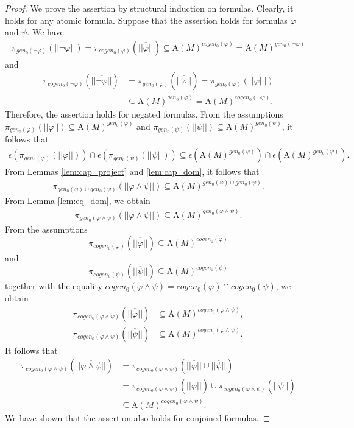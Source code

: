 \documentclass{lmcs}
\def\A{\textrm{A}}
\def\gen{gen}
\def\cogen{cogen}
\def\genz{\gen_0}
\def\cogenz{\cogen_0}
\begin{document}
\begin{proof}
We prove the assertion by structural induction on formulas. Clearly, it holds for any atomic formula. Suppose that the assertion holds for formulas $\varphi$ and $\psi$. We have
\begin{align*}
\pi_{\genz(\neg\varphi)}(||\neg\varphi||)=\pi_{\cogenz(\varphi)}(\overline{||\varphi||})\subseteq\A(M)^{\cogenz(\varphi)}=\A(M)^{\genz(\neg\varphi)}
\end{align*}
and 
\begin{align*}
\pi_{\cogenz(\neg\varphi)}(\overline{||\neg\varphi||})&=\pi_{\genz(\varphi)}(\overline{\overline{||\varphi||}})=\pi_{\genz(\varphi)}(||\varphi|||)\\
&\subseteq\A(M)^{\genz(\varphi)}=\A(M)^{\cogenz(\neg\varphi)}.
\end{align*}
Therefore, the assertion holds for negated formulas.
From the assumptions $\pi_{\genz(\varphi)}(||\varphi||)\subseteq \A(M)^{\genz(\varphi)}$ and $\pi_{\genz(\psi)}(||\psi||)\subseteq \A(M)^{\genz(\psi)}$, it follows that 
\begin{align*}
\epsilon(\pi_{\genz(\varphi)}(||\varphi||))\cap\epsilon(\pi_{\genz(\psi)}(||\psi||))\subseteq\epsilon(\A(M)^{\genz(\varphi)})\cap\epsilon(\A(M)^{\genz(\psi)}).
\end{align*}
From Lemmas \ref{lem:cap_project} and \ref{lem:cap_dom}, it follows that
\begin{align*}
\pi_{\genz(\varphi)\cup\genz(\psi)}(||\varphi\wedge\psi||)\subseteq\A(M)^{\genz(\varphi)\cup\genz(\psi)}. 
\end{align*}
From Lemma \ref{lem:eq_dom}, we obtain
\begin{align*}
\pi_{\genz(\varphi\wedge\psi)}(||\varphi\wedge\psi||)\subseteq\A(M)^{\genz(\varphi\wedge\psi)}. 
\end{align*}
From the assumptions 
$$\pi_{\cogenz(\varphi)}(\overline{||\varphi||})\subseteq \A(M)^{\cogenz(\varphi)}$$ 
and 
$$\pi_{\cogenz(\psi)}(\overline{||\psi||})\subseteq \A(M)^{\cogenz(\psi)}$$
together with the equality $\cogenz(\varphi\wedge\psi)=\cogenz(\varphi)\cap\cogenz(\psi)$, we obtain 
\begin{align*}
\pi_{\cogenz(\varphi\wedge\psi)}(\overline{||\varphi||})&\subseteq \A(M)^{\cogenz(\varphi\wedge\psi)},\\
\pi_{\cogenz(\varphi\wedge\psi)}(\overline{||\psi||})&\subseteq \A(M)^{\cogenz(\varphi\wedge\psi)}. 
\end{align*}
It follows that
\begin{align*}
\pi_{\cogenz(\varphi\wedge\psi)}(\overline{||\varphi\wedge\psi||})&= \pi_{\cogenz(\varphi\wedge\psi)}(\overline{||\varphi||}\cup\overline{||\psi||})\\
&=\pi_{\cogenz(\varphi\wedge\psi)}(\overline{||\varphi||})\cup\pi_{\cogenz(\varphi\wedge\psi)}(\overline{||\psi||})\\
&\subseteq\A(M)^{\cogenz(\varphi\wedge\psi)}.
\end{align*}
We have shown that the assertion also holds for conjoined formulas.


\end{proof}
\end{document}
